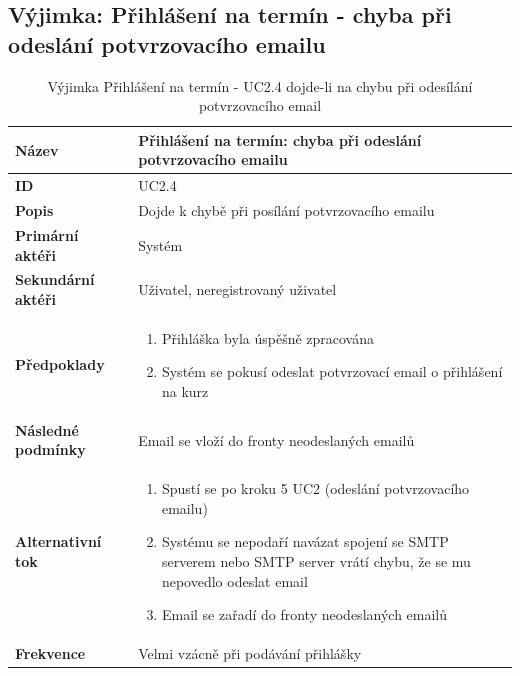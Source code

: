\documentclass[12pt,a4paper,titlepage,final]{report}
\begin{document}
\subsection{Výjimka: Přihlášení na termín - chyba při odeslání potvrzovacího emailu}
\begin{table}[!h]
\begin{center}
    \begin{tabular}{ | p{4.2cm} | p{12.2cm} | }
    \hline
    \textbf{Název} & Přihlášení na termín: chyba při odeslání potvrzovacího emailu
    \\ \hline
    
	\textbf{ID} & UC2.4
	\\ \hline
	
	\textbf{Popis} & Dojde k chybě při posílání potvrzovacího emailu
	\\ \hline
	    
	\textbf{Primární aktéři} & Systém
	\\ \hline
	
	\textbf{Sekundární aktéři} & Uživatel, neregistrovaný  uživatel
	\\ \hline
	
	\textbf{Předpoklady} & 
    \vspace{-3.5mm}
	\begin{enumerate}
        \itemsep0em 		
		\item Přihláška byla úspěšně zpracována
		\item Systém se pokusí odeslat potvrzovací email o přihlášení na kurz		
	\end{enumerate}
    \\ \hline
    
    \textbf{Následné podmínky} & Email se vloží do fronty neodeslaných emailů
    \\ \hline 
    
    \textbf{Alternativní tok} & 

        \vspace{-3.5mm}  
		\begin{enumerate}
	        \itemsep0em 			
			\item Spustí se po kroku 5 UC2 (odeslání potvrzovacího emailu)
			\item Systému se nepodaří navázat spojení se SMTP serverem nebo SMTP server vrátí chybu, že se mu nepovedlo odeslat email
			\item Email se zařadí do fronty neodeslaných emailů
		\end{enumerate}		       
    \\ \hline    
    
	\textbf{Frekvence} & Velmi vzácně při podávání přihlášky
	\\ \hline
	\end{tabular}
\end{center}
	\caption{Výjimka Přihlášení na termín - UC2.4 dojde-li na chybu při odesílání potvrzovacího email}
\end{table}
\end{document}
